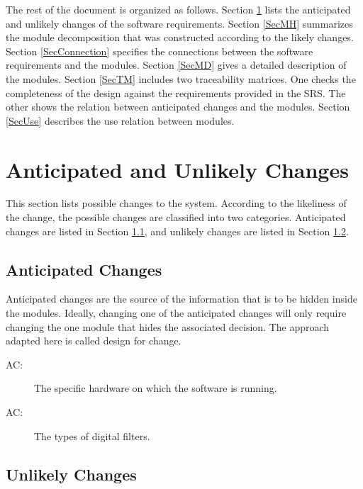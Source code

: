 \documentclass[12pt, titlepage]{article}
\newcounter{acnum}
\newcommand{\actheacnum}{AC\theacnum}
\begin{document}
The rest of the document is organized as follows. Section \ref{SecChange} lists
the anticipated and unlikely changes of the software requirements. Section
\ref{SecMH} summarizes the module decomposition that was constructed according
to the likely changes. Section \ref{SecConnection} specifies the connections
between the software requirements and the modules. Section \ref{SecMD} gives a
detailed description of the modules. Section \ref{SecTM} includes two
traceability matrices. One checks the completeness of the design against the
requirements provided in the SRS. The other shows the relation between
anticipated changes and the modules. Section \ref{SecUse} describes the use
relation between modules.

\section{Anticipated and Unlikely Changes} \label{SecChange}

This section lists possible changes to the system. According to the likeliness
of the change, the possible changes are classified into two categories.
Anticipated changes are listed in Section \ref{SecAchange}, and unlikely changes
are listed in Section \ref{SecUchange}.

\subsection{Anticipated Changes} \label{SecAchange}

Anticipated changes are the source of the information that is to be hidden
inside the modules. Ideally, changing one of the anticipated changes will only
require changing the one module that hides the associated decision. The approach
adapted here is called design for change.

\begin{description}
\item[ \actheacnum \label{acHardware}:] The specific
hardware on which the software is running.
\item[ \actheacnum \label{acFilter}:] The types of digital
filters.
\end{description}


\subsection{Unlikely Changes} \label{SecUchange}
\end{document}
